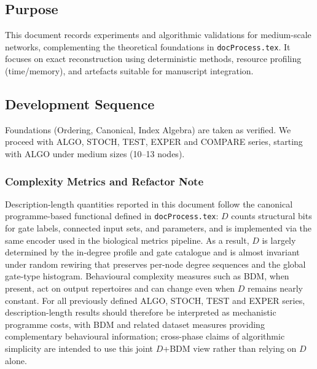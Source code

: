 


\clearpage

\subsection{Purpose}
This document records experiments and algorithmic validations for medium-scale networks, complementing the theoretical foundations in \texttt{docProcess.tex}. It focuses on exact reconstruction using deterministic methods, resource profiling (time/memory), and artefacts suitable for manuscript integration.

\subsection{Development Sequence}
Foundations (Ordering, Canonical, Index Algebra) are taken as verified. We proceed with ALGO, STOCH, TEST, EXPER and COMPARE series, starting with ALGO under medium sizes (10--13 nodes).

\subsubsection{Complexity Metrics and Refactor Note}
Description-length quantities reported in this document follow the canonical programme-based functional defined in \texttt{docProcess.tex}: \(D\) counts structural bits for gate labels, connected input sets, and parameters, and is implemented via the same encoder used in the biological metrics pipeline. As a result, \(D\) is largely determined by the in-degree profile and gate catalogue and is almost invariant under random rewiring that preserves per-node degree sequences and the global gate-type histogram. Behavioural complexity measures such as BDM, when present, act on output repertoires and can change even when \(D\) remains nearly constant. For all previously defined ALGO, STOCH, TEST and EXPER series, description-length results should therefore be interpreted as mechanistic programme costs, with BDM and related dataset measures providing complementary behavioural information; cross-phase claims of algorithmic simplicity are intended to use this joint \(D\)+BDM view rather than relying on \(D\) alone.

